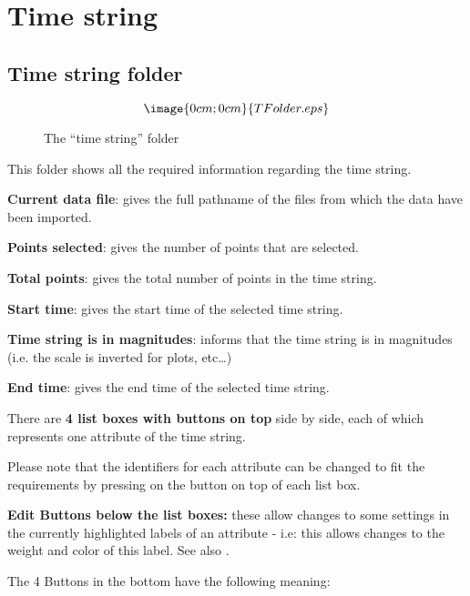 \section{Time string}%
\label{timestring.detailed}

\subsection{Time string folder}%
\label{timestring.folder}
\begin{figure}[hb]
$$\image{0cm;0cm}{TFolder.eps}$$%
\caption{The ``time string'' folder}%
\label{timestring.folder.dialog}
\end{figure}

This folder shows all the required information regarding the time string.

{\bf Current data file}: 
gives the full pathname 
of the files from which the data have been imported.

{\bf Points selected}: 
gives the number of points that are selected.

{\bf Total points}: 
gives the total number of points in the time string.

{\bf Start time}:
gives the start time of the selected time string.

{\bf Time string is in magnitudes}:
informs \periodname that the time string is in magnitudes 
(i.e. the scale is inverted for plots, etc\ldots)

{\bf End time}:
gives the end time of the selected time string.

There are {\bf 4 list boxes with buttons on top} side by side,
each of which represents one attribute of the time string.

Please note that the identifiers for each attribute can be changed
to fit the requirements by pressing on the button on top of each list box.

{\bf Edit Buttons below the list boxes:}
these allow changes to some settings in the currently 
highlighted labels of an attribute - i.e: this allows changes to
the weight and color of this label.
See also .

The 4 Buttons in the bottom have the following meaning:

